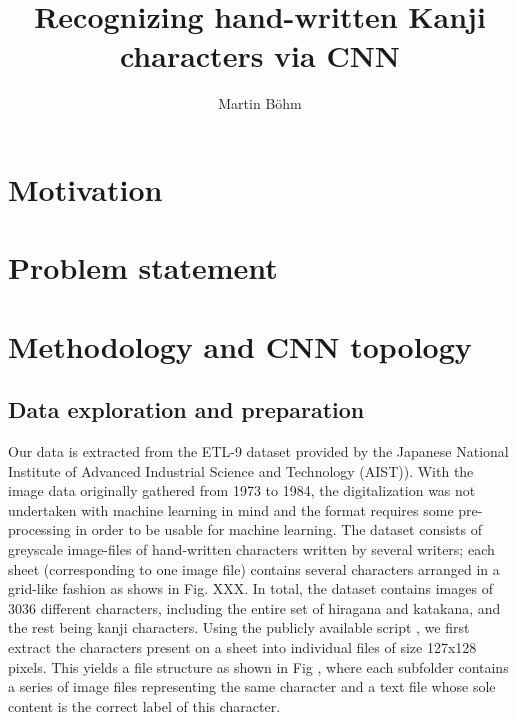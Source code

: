 \documentclass[british,12p]{article}
\title{Recognizing hand-written Kanji characters via CNN}
\author{
        Martin Böhm
        }
\begin{document}
	\maketitle
    \begin{abstract}

           

    \end{abstract}
        
    \section{Motivation}
    
    \section{Problem statement}
    \section{Methodology and CNN topology}
    \subsection{Data exploration and preparation}
    Our data is extracted from the ETL-9 dataset provided by the Japanese National Institute of Advanced Industrial Science and Technology (AIST)). With the image data originally gathered from 1973 to 1984, the digitalization was not undertaken with machine learning in mind and the format requires some pre-processing in order to be usable for machine learning. The dataset consists of greyscale image-files of hand-written characters written by several writers; each sheet (corresponding to one image file) contains several characters arranged in a grid-like fashion as shows in Fig. XXX. In total, the dataset contains  images of 3036 different characters, including the entire set of hiragana and katakana, and the rest being kanji characters. 
    	Using the publicly available script , we first extract the characters present on a sheet into individual files of size 127x128 pixels. This yields a file structure as shown in Fig , where each subfolder contains a series of image files representing the same character and a text file whose sole content is the correct label of this character.
    	
\end{document}
